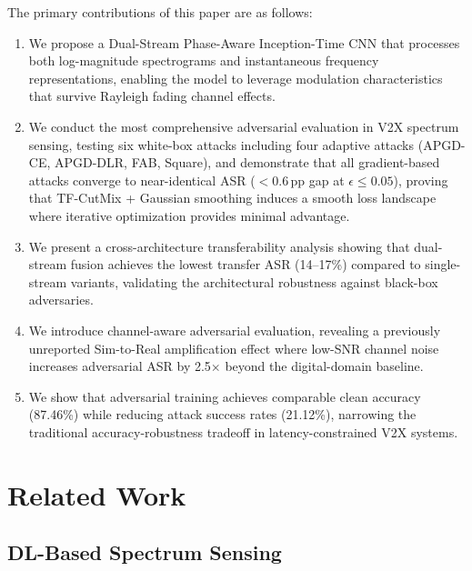 \documentclass[conference]{IEEEtran}
\begin{document}
The primary contributions of this paper are as follows:

\begin{enumerate}
\item We propose a Dual-Stream Phase-Aware Inception-Time CNN that processes both log-magnitude spectrograms and instantaneous frequency representations, enabling the model to leverage modulation characteristics that survive Rayleigh fading channel effects.

\item We conduct the most comprehensive adversarial evaluation in V2X spectrum sensing, testing six white-box attacks including four adaptive attacks (APGD-CE, APGD-DLR, FAB, Square), and demonstrate that all gradient-based attacks converge to near-identical ASR ($<$0.6\,pp gap at $\epsilon \leq 0.05$), proving that TF-CutMix + Gaussian smoothing induces a smooth loss landscape where iterative optimization provides minimal advantage.

\item We present a cross-architecture transferability analysis showing that dual-stream fusion achieves the lowest transfer ASR (14--17\%) compared to single-stream variants, validating the architectural robustness against black-box adversaries.

\item We introduce channel-aware adversarial evaluation, revealing a previously unreported Sim-to-Real amplification effect where low-SNR channel noise increases adversarial ASR by 2.5$\times$ beyond the digital-domain baseline.

\item We show that adversarial training achieves comparable clean accuracy (87.46\%) while reducing attack success rates (21.12\%), narrowing the traditional accuracy-robustness tradeoff in latency-constrained V2X systems.
\end{enumerate}

\section{Related Work}
\label{sec:related}

\subsection{DL-Based Spectrum Sensing}
\end{document}
